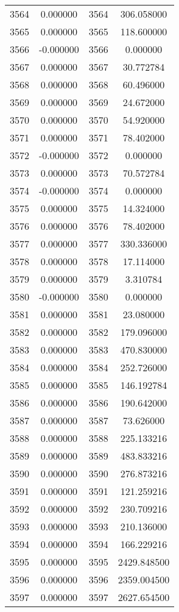 \documentclass[12pt]{article}
\begin{document}
\begin{longtable}{@{}cccc@{}}
3564 & 0.000000 & 3564 & 306.058000 \\
3565 & 0.000000 & 3565 & 118.600000 \\
3566 & -0.000000 & 3566 & 0.000000 \\
3567 & 0.000000 & 3567 & 30.772784 \\
3568 & 0.000000 & 3568 & 60.496000 \\
3569 & 0.000000 & 3569 & 24.672000 \\
3570 & 0.000000 & 3570 & 54.920000 \\
3571 & 0.000000 & 3571 & 78.402000 \\
3572 & -0.000000 & 3572 & 0.000000 \\
3573 & 0.000000 & 3573 & 70.572784 \\
3574 & -0.000000 & 3574 & 0.000000 \\
3575 & 0.000000 & 3575 & 14.324000 \\
3576 & 0.000000 & 3576 & 78.402000 \\
3577 & 0.000000 & 3577 & 330.336000 \\
3578 & 0.000000 & 3578 & 17.114000 \\
3579 & 0.000000 & 3579 & 3.310784 \\
3580 & -0.000000 & 3580 & 0.000000 \\
3581 & 0.000000 & 3581 & 23.080000 \\
3582 & 0.000000 & 3582 & 179.096000 \\
3583 & 0.000000 & 3583 & 470.830000 \\
3584 & 0.000000 & 3584 & 252.726000 \\
3585 & 0.000000 & 3585 & 146.192784 \\
3586 & 0.000000 & 3586 & 190.642000 \\
3587 & 0.000000 & 3587 & 73.626000 \\
3588 & 0.000000 & 3588 & 225.133216 \\
3589 & 0.000000 & 3589 & 483.833216 \\
3590 & 0.000000 & 3590 & 276.873216 \\
3591 & 0.000000 & 3591 & 121.259216 \\
3592 & 0.000000 & 3592 & 230.709216 \\
3593 & 0.000000 & 3593 & 210.136000 \\
3594 & 0.000000 & 3594 & 166.229216 \\
3595 & 0.000000 & 3595 & 2429.848500 \\
3596 & 0.000000 & 3596 & 2359.004500 \\
3597 & 0.000000 & 3597 & 2627.654500 \\

\end{longtable}
\end{document}
